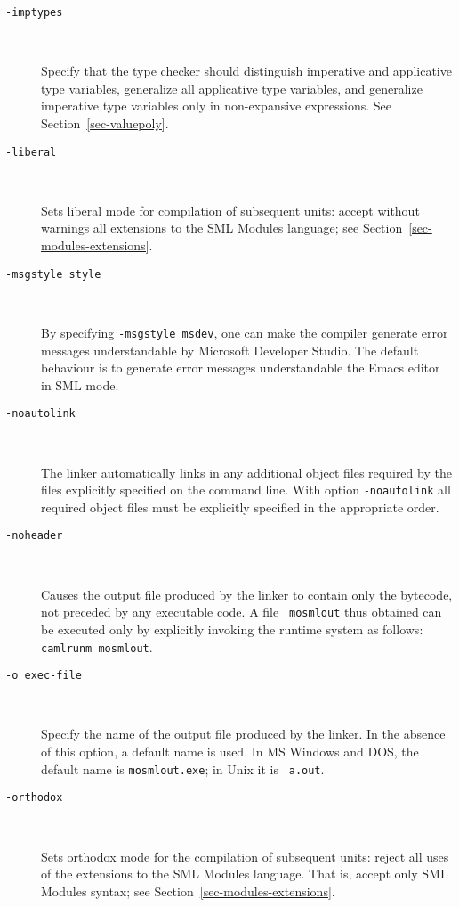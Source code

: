 \documentclass[fleqn,a4paper]{article}
\begin{document}
\begin{description}
\item[{\tt -imptypes}]\mbox{ }

  Specify that the type checker should distinguish imperative and
  applicative type variables, generalize all applicative type
  variables, and generalize imperative type variables only in
  non-expansive expressions.  See Section~\ref{sec-valuepoly}.

\item[{\tt -liberal}]\mbox{ }
  
  Sets liberal mode for compilation of subsequent units: accept
  without warnings all extensions to the SML Modules language; see
  Section~\ref{sec-modules-extensions}.

\item[{\tt -msgstyle \textrm{style}}]\mbox{ }
  
  By specifying \texttt{-msgstyle msdev}, one can make the compiler
  generate error messages understandable by Microsoft Developer
  Studio.  The default behaviour is to generate error messages
  understandable the Emacs editor in SML mode.

\item[{\tt -noautolink}]\mbox{ }
  
  The linker automatically links in any additional object files
  required by the files explicitly specified on the command line.
  With option {\tt -noautolink} all required object files must be
  explicitly specified in the appropriate order.

\item[{\tt -noheader}]\mbox{ }

  Causes the output file produced by the linker to contain only the
  bytecode, not preceded by any executable code.  A file {\tt
    mosmlout} thus obtained can be executed only by explicitly
  invoking the runtime system as follows: {\tt camlrunm mosmlout}.

\item[{\tt -o {\rm exec-file}}]\mbox{ }

  Specify the name of the output file produced by the linker.  In the
  absence of this option, a default name is used.  In MS Windows and
  DOS, the default name is {\tt mosmlout.exe}; in Unix it is {\tt
    a.out}.

\item[{\tt -orthodox}]\mbox{ }
  
  Sets orthodox mode for the compilation of subsequent units: reject
  all uses of the extensions to the SML Modules language.  That is,
  accept only SML Modules syntax; see
  Section~\ref{sec-modules-extensions}.


\end{description}
\end{document}
